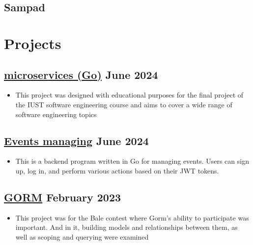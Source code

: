 \documentclass[11pt]{article}
\begin{document}
\subsection{\textcolor{primaryColor}{\faUniversity}\hspace{0.5em} Sampad}


\section{Projects}

\subsection[microservices (Go)]{\href{https://github.com/younesious/go-microservices}{microservices (Go)} \hfill \textcolor{secondaryColor}{\small June 2024}}
\begin{itemize}
    \item[\color{primaryColor}\small\faLaptopCode] \small{This project was designed with educational purposes for the final project of the IUST software engineering course and aims to cover a wide range of software engineering topics}
\end{itemize}

\subsection[Events managing]{\href{https://github.com/younesious/events}{Events managing} \hfill \textcolor{secondaryColor}{\small June 2024}}
\begin{itemize}
    \item[\color{primaryColor}\small\faLaptopCode] \small{This is a backend program written in Go for managing events. Users can sign up, log in, and perform various actions based on their JWT tokens.}
\end{itemize}

\subsection[GORM]{\href{https://github.com/younesious/GORM}{GORM} \hfill \textcolor{secondaryColor}{\small February 2023}}
\begin{itemize}
    \item[\color{primaryColor}\small\faLaptopCode] \small{This project was for the Bale contest where Gorm's ability to participate was important. And in it, building models and relationships between them, as well as scoping and querying were examined}
\end{itemize}
\end{document}
